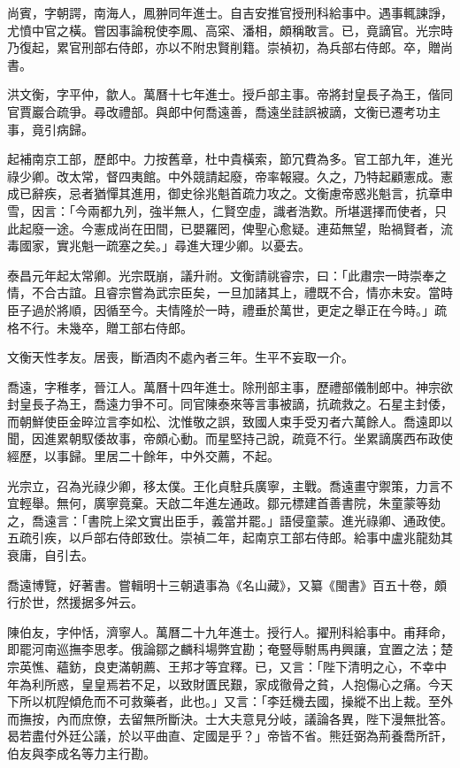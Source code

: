 \begin{pinyinscope}
尚賓，字朝諤，南海人，鳳翀同年進士。自吉安推官授刑科給事中。遇事輒諫諍，尤憤中官之橫。嘗因事論稅使李鳳、高寀、潘相，頗稱敢言。已，竟謫官。光宗時乃復起，累官刑部右侍郎，亦以不附忠賢削籍。崇禎初，為兵部右侍郎。卒，贈尚書。

洪文衡，字平仲，歙人。萬曆十七年進士。授戶部主事。帝將封皇長子為王，偕同官賈巖合疏爭。尋改禮部。與郎中何喬遠善，喬遠坐詿誤被謫，文衡已遷考功主事，竟引病歸。

起補南京工部，歷郎中。力按舊章，杜中貴橫索，節冗費為多。官工部九年，進光祿少卿。改太常，督四夷館。中外競請起廢，帝率報寢。久之，乃特起顧憲成。憲成已辭疾，忌者猶憚其進用，御史徐兆魁首疏力攻之。文衡慮帝惑兆魁言，抗章申雪，因言：「今兩都九列，強半無人，仁賢空虛，識者浩歎。所堪選擇而使者，只此起廢一途。今憲成尚在田間，已嬰羅罔，俾聖心愈疑。連茹無望，貽禍賢者，流毒國家，實兆魁一疏塞之矣。」尋進大理少卿。以憂去。

泰昌元年起太常卿。光宗既崩，議升祔。文衡請祧睿宗，曰：「此肅宗一時崇奉之情，不合古誼。且睿宗嘗為武宗臣矣，一旦加諸其上，禮既不合，情亦未安。當時臣子過於將順，因循至今。夫情隆於一時，禮垂於萬世，更定之舉正在今時。」疏格不行。未幾卒，贈工部右侍郎。

文衡天性孝友。居喪，斷酒肉不處內者三年。生平不妄取一介。

喬遠，字稚孝，晉江人。萬曆十四年進士。除刑部主事，歷禮部儀制郎中。神宗欲封皇長子為王，喬遠力爭不可。同官陳泰來等言事被謫，抗疏救之。石星主封倭，而朝鮮使臣金晬泣言李如松、沈惟敬之誤，致國人束手受刃者六萬餘人。喬遠即以聞，因進累朝馭倭故事，帝頗心動。而星堅持己說，疏竟不行。坐累謫廣西布政使經歷，以事歸。里居二十餘年，中外交薦，不起。

光宗立，召為光祿少卿，移太僕。王化貞駐兵廣寧，主戰。喬遠畫守禦策，力言不宜輕舉。無何，廣寧竟棄。天啟二年進左通政。鄒元標建首善書院，朱童蒙等劾之，喬遠言：「書院上梁文實出臣手，義當并罷。」語侵童蒙。進光祿卿、通政使。五疏引疾，以戶部右侍郎致仕。崇禎二年，起南京工部右侍郎。給事中盧兆龍劾其衰庸，自引去。

喬遠博覽，好著書。嘗輯明十三朝遺事為《名山藏》，又纂《閩書》百五十卷，頗行於世，然援据多舛云。

陳伯友，字仲恬，濟寧人。萬曆二十九年進士。授行人。擢刑科給事中。甫拜命，即罷河南巡撫李思孝。俄論鄒之麟科場弊宜勘；奄豎辱駙馬冉興讓，宜置之法；楚宗英憔、蘊鈁，良吏滿朝薦、王邦才等宜釋。已，又言：「陛下清明之心，不幸中年為利所惑，皇皇焉若不足，以致財匱民艱，家成徹骨之貧，人抱傷心之痛。今天下所以杌隉傾危而不可救藥者，此也。」又言：「李廷機去國，操縱不出上裁。至外而撫按，內而庶僚，去留無所斷決。士大夫意見分岐，議論各異，陛下漫無批答。曷若盡付外廷公議，於以平曲直、定國是乎？」帝皆不省。熊廷弼為荊養喬所訐，伯友與李成名等力主行勘。


\end{pinyinscope}
